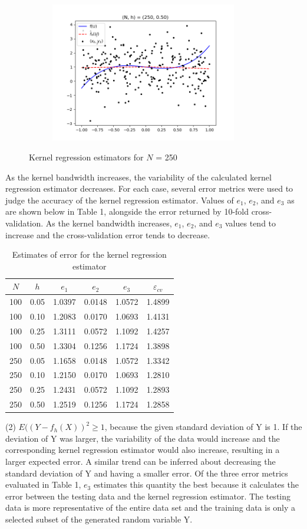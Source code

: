 \begin{figure}[h!]
\begin{subfigure}[h]{0.5\textwidth}
        \includegraphics[height=2.4in]{Figure_8.png}
    \end{subfigure}
    \caption{Kernel regression estimators for $N$ = 250}
\end{figure}

As the kernel bandwidth increases, the variability of the calculated kernel regression estimator decreases. For each case, several error metrics were used to judge the accuracy of the kernel regression estimator. Values of $e_{1}$, $e_{2}$, and $e_{3}$ as are shown below in Table 1, alongside the error returned by 10-fold cross-validation. As the kernel bandwidth increases, $e_{1}$, $e_{2}$, and $e_{3}$ values tend to increase and the cross-validation error tends to decrease.

\begin{table}[h!]
\centering
 \begin{tabular}{||c c c c c c||} 
 \hline
 $N$ & $h$ & $e_1$ & $e_2$ & $e_3$ & $\varepsilon_{cv}$ \\ [0.5ex] 
 \hline\hline
100 & 0.05 & 1.0397 & 0.0148 & 1.0572 & 1.4899 \\
100 & 0.10 & 1.2083 & 0.0170 & 1.0693 & 1.4131 \\
100 & 0.25 & 1.3111 & 0.0572 & 1.1092 & 1.4257 \\
100 & 0.50 & 1.3304 & 0.1256 & 1.1724 & 1.3898 \\
250 & 0.05 & 1.1658 & 0.0148 & 1.0572 & 1.3342 \\
250 & 0.10 & 1.2150 & 0.0170 & 1.0693 & 1.2810 \\
250 & 0.25 & 1.2431 & 0.0572 & 1.1092 & 1.2893 \\
250 & 0.50 & 1.2519 & 0.1256 & 1.1724 & 1.2858 \\ [1ex] 
 \hline
 \end{tabular}
 \caption{Estimates of error for the kernel regression estimator}
\label{table:1}
\end{table}

(2) \(E((Y - f_{h}(X))^{2} \geq 1\), because the given standard deviation of Y is 1. If the deviation of Y was larger, the variability of the data would increase and the corresponding kernel regression estimator would also increase, resulting in a larger expected error. A similar trend can be inferred about decreasing the standard deviation of Y and having a smaller error. Of the three error metrics evaluated in Table 1, $e_{3}$ estimates this quantity the best because it calculates the error between the testing data and the kernel regression estimator. The testing data is more representative of the entire data set and the training data is only a selected subset of the generated random variable Y.